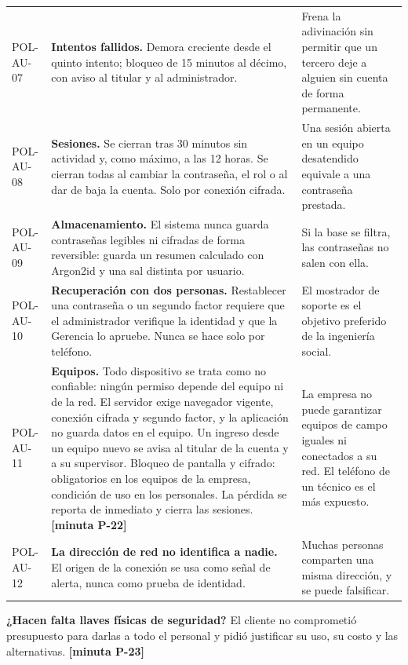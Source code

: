 \documentclass[11pt,letterpaper]{article}
\newcommand{\resp}[1]{\textrm{\footnotesize\bfseries [minuta #1]}}
\begin{document}
{\begin{longtable}{@{}L{1.7cm} L{9.2cm} L{4.8cm}@{}}
POL-AU-07 & \textbf{Intentos fallidos.} Demora creciente desde el quinto intento; bloqueo de 15 minutos al décimo, con aviso al titular y al administrador. & Frena la adivinación sin permitir que un tercero deje a alguien sin cuenta de forma permanente. \\
POL-AU-08 & \textbf{Sesiones.} Se cierran tras 30 minutos sin actividad y, como máximo, a las 12 horas. Se cierran todas al cambiar la contraseña, el rol o al dar de baja la cuenta. Solo por conexión cifrada. & Una sesión abierta en un equipo desatendido equivale a una contraseña prestada. \\
POL-AU-09 & \textbf{Almacenamiento.} El sistema nunca guarda contraseñas legibles ni cifradas de forma reversible: guarda un resumen calculado con Argon2id y una sal distinta por usuario. & Si la base se filtra, las contraseñas no salen con ella. \\
POL-AU-10 & \textbf{Recuperación con dos personas.} Restablecer una contraseña o un segundo factor requiere que el administrador verifique la identidad y que la Gerencia lo apruebe. Nunca se hace solo por teléfono. & El mostrador de soporte es el objetivo preferido de la ingeniería social. \\
POL-AU-11 & \textbf{Equipos.} Todo dispositivo se trata como no confiable: ningún permiso depende del equipo ni de la red. El servidor exige navegador vigente, conexión cifrada y segundo factor, y la aplicación no guarda datos en el equipo. Un ingreso desde un equipo nuevo se avisa al titular de la cuenta y a su supervisor. Bloqueo de pantalla y cifrado: obligatorios en los equipos de la empresa, condición de uso en los personales. La pérdida se reporta de inmediato y cierra las sesiones. \resp{P-22} & La empresa no puede garantizar equipos de campo iguales ni conectados a su red. El teléfono de un técnico es el más expuesto. \\
POL-AU-12 & \textbf{La dirección de red no identifica a nadie.} El origen de la conexión se usa como señal de alerta, nunca como prueba de identidad. & Muchas personas comparten una misma dirección, y se puede falsificar. \\
\end{longtable}
}

\textbf{¿Hacen falta llaves físicas de seguridad?} El cliente no comprometió presupuesto para darlas a
todo el personal y pidió justificar su uso, su costo y las alternativas. \resp{P-23}
\end{document}
